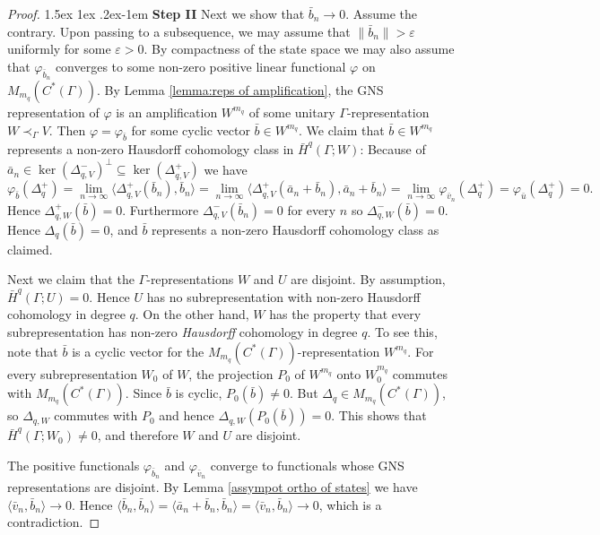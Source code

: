 \documentclass[12pt,reqno]{amsart}
\makeatletter
\theoremstyle{definition}
\renewcommand\paragraph{\@startsection{paragraph}{4}{\z@}%
  {1.5ex \@plus 1ex \@minus .2ex}{-1em}%
  {\normalfont\normalsize\bfseries}}
\makeatother
\begin{document}
\begin{proof}
    \paragraph{\textbf{Step II}} Next we show that $\bar{b}_n\to 0$. Assume the contrary. Upon passing to a subsequence, we may assume that $\| \bar{b}_n\|>\varepsilon$ uniformly for some $\varepsilon > 0$. By compactness of the state space we may also assume that $\varphi_{\bar{b}_n}$ converges to some non-zero positive linear functional $\varphi$ on $M_{m_q}(C^*(\Gamma))$. By Lemma \ref{lemma:reps of amplification}, the GNS representation of $\varphi$ is an amplification $W^{m_q}$ of some unitary $\Gamma$-representation $W \prec_\Gamma V$. Then $\varphi=\varphi_{\bar{b}}$ for some cyclic vector $\bar{b} \in W^{m_q}$. We claim that $\bar{b}\in W^{m_q}$ represents a non-zero Hausdorff cohomology class in $\bar H^q(\Gamma; W)$: Because of $\bar a_n \in \ker(\Delta_{q,V}^-)^{\perp} \subseteq \ker(\Delta_{q,V}^+)$ we have 
    \[\varphi_{\bar{b}}(\Delta_q^+)=\lim_{n \rightarrow \infty}\langle \Delta_{q,V}^+(\bar{b}_n),\bar{b}_n\rangle=\lim_{n \rightarrow \infty}\langle \Delta_{q,V}^+(\bar{a}_n+\bar{b}_n), \bar{a}_n+\bar{b}_n\rangle=\lim_{n \rightarrow \infty}\varphi_{\bar{v}_n}(\Delta_q^+)=\varphi_{\bar{u}}(\Delta_q^+) =0.\]
    Hence $\Delta_{q,W}^+(\bar{b})=0$. Furthermore $\Delta_{q,V}^-(\bar{b}_n)=0$ for every $n$ so $\Delta_{q,W}^-(\bar{b})=0$. Hence $\Delta_q(\bar{b})=0$, and $\bar{b}$ represents a non-zero Hausdorff cohomology class as claimed.

    Next we claim that the $\Gamma$-representations $W$ and $U$ are disjoint. By assumption, $\bar{H}^q(\Gamma;U)=0$. Hence $U$ has no subrepresentation with non-zero Hausdorff cohomology in degree $q$. On the other hand, $W$ has the property that every subrepresentation has non-zero \emph{Hausdorff} cohomology in degree $q$. To see this, note that $\bar{b}$ is a cyclic vector for the $M_{m_q}(C^*(\Gamma))$-representation $W^{m_q}$. For every subrepresentation $W_0$ of $W$, the projection $P_0$ of $W^{m_q}$ onto $W_0^{m_q}$ commutes with $M_{m_q}(C^*(\Gamma))$. Since $\bar{b}$ is cyclic, $P_0(\bar{b}) \ne 0$. But $\Delta_q \in M_{m_q}(C^*(\Gamma))$, so $\Delta_{q,W}$ commutes with $P_0$ and hence $\Delta_{q,W}(P_0(\bar{b}))=0$. This shows that $\bar{H}^q(\Gamma;W_0) \ne 0$, and therefore $W$ and $U$ are disjoint.
    
    The positive functionals $\varphi_{\bar{b}_n}$ and $\varphi_{\bar{v}_n}$ converge to functionals whose GNS representations are disjoint. By Lemma \ref{assympot ortho of states} we have $\langle \bar{v}_n,\bar{b}_n \rangle \rightarrow 0$. Hence $\langle\bar{b}_n,\bar{b}_n \rangle=\langle \bar{a}_n + \bar{b}_n,\bar{b}_n \rangle=\langle\bar{v}_n,\bar{b}_n \rangle \rightarrow 0$, which is a contradiction. 

\end{proof}
\end{document}
